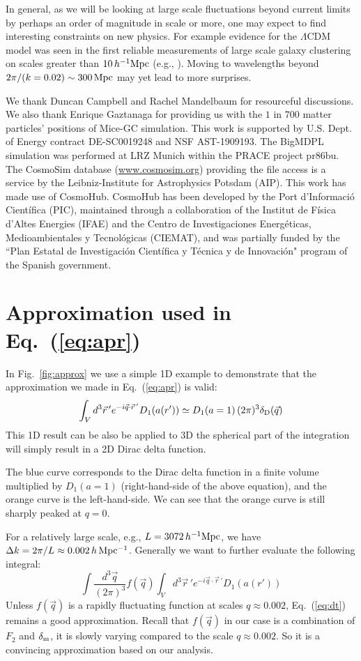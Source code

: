 \documentclass[prd,amsmath,amssymb,floatfix,superscriptaddress,nofootinbib,twocolumn]{revtex4-1}
\def\be{\begin{equation}}
\def\ee{\end{equation}}
\newcommand{\vrr}{\vec{r}}
\newcommand{\ec}[1]{Eq.~(\ref{eq:#1})}
\newcommand{\rf}[1]{\ref{fig:#1}}
\begin{document}
In general, as we will be looking at large scale fluctuations beyond current limits by perhaps an order of magnitude in scale or more, one may expect to find interesting constraints on new physics. For example evidence for the $\Lambda$CDM model was seen in the first reliable measurements of large scale galaxy clustering on scales greater than $10\,h^{-1}\rm Mpc$ (e.g., \cite{Efstathio:1990cdm}). Moving to wavelengths beyond $2\pi/(k=0.02) \sim 300 \rm \, Mpc$ may yet lead to more surprises.

\acknowledgements
We thank Duncan Campbell and Rachel Mandelbaum for resourceful discussions. We also thank Enrique Gaztanaga for providing us with the $1$ in $700$ matter particles' positions of Mice-GC simulation. This work is supported by U.S. Dept. of Energy contract DE-SC0019248 and NSF AST-1909193.
The BigMDPL simulation was performed at LRZ Munich within the PRACE project pr86bu. The CosmoSim database (\url{www.cosmosim.org}) providing the file access is a service by the Leibniz-Institute for Astrophysics Potsdam (AIP).
This work has made use of CosmoHub. CosmoHub has been developed by the Port d'Informació Científica (PIC), maintained through a collaboration of the Institut de Física d'Altes Energies (IFAE) and the Centro de Investigaciones Energéticas, Medioambientales y Tecnológicas (CIEMAT), and was partially funded by the ``Plan Estatal de Investigación Científica y Técnica y de Innovación" program of the Spanish government.
\clearpage

\appendix 


\noindent 
\section{Approximation used in \ec{apr}}\label{appenda}
In Fig.~\rf{approx} we use a simple 1D example to demonstrate that the approximation we made in \ec{apr} is valid:
\be 
\int_{V} d^{3}\vrr\, 'e^{-i\vec{q}\cdot \vrr\, '}{D_{1}(a(r'))}  \simeq D_{1}(a=1)\,(2\pi)^3\delta_{\rm D}(\vec{q})
\ee 
This 1D result can be also be applied to 3D the spherical part of the integration will simply result in a 2D Dirac delta function.

The blue curve corresponds to the Dirac delta function in a finite volume multiplied by $D_{1}(a=1)$ (right-hand-side of the above equation), and the orange curve is the left-hand-side. We can see that the orange curve is still sharply peaked at $q=0$. 

For a relatively large scale, e.g., $L=3072\, h^{-1}\rm Mpc$, we have $\Delta k=2\pi/L\approx 0.002 \, h \, \rm Mpc^{-1}$. Generally we want to further evaluate the following integral:
\be
\int \frac{d^{3}\vec{q}}{(2\pi)^3}f(\vec{q}) \int_{V} d^{3}\vrr\, 'e^{-i\vec{q}\cdot \vrr\, '}{D_{1}(a(r'))}
\ee 
Unless $f(\vec{q})$ is a rapidly fluctuating function at scales $q \approx 0.002$, \ec{dt} remains a good approximation. Recall that $f(\vec{q})$ in our case is a combination of $F_{2}$ and $\delta_{\rm m}$, it is slowly varying compared to the scale $q \approx 0.002$. So it is a convincing approximation based on our analysis.
\end{document}
